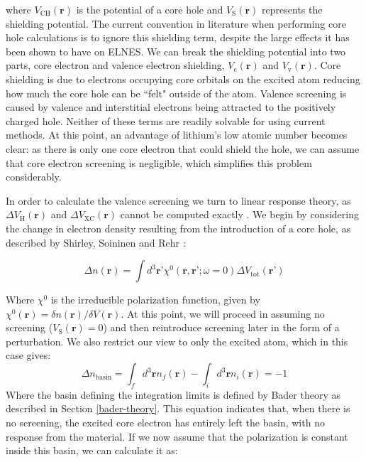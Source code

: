 where $V_{\mathrm{CH}}(\textbf{r})$ is the potential of a core hole and  $V_{\mathrm{S}}(\textbf{r})$ represents the shielding potential.  The current convention in literature when performing core hole calculations is to ignore this shielding term, despite the large effects it has been shown to have on ELNES.  We can break the shielding potential into two parts, core electron and valence electron shielding, $V_{\mathrm{c}}(\textbf{r})$ and  $V_{\mathrm{v}}(\textbf{r})$. Core shielding is due to electrons occupying core orbitals on the excited atom reducing how much the core hole can be ``felt" outside of the atom.  Valence screening is caused by valence and interstitial electrons being attracted to the positively charged hole.  Neither of these terms are readily solvable for using current methods.  At this point, an advantage of lithium's low atomic number becomes clear: as there is only one core electron that could shield the hole, we can assume that core electron screening is negligible, which simplifies this problem considerably.  

In order to calculate the valence screening we turn to linear response theory, as  $\Delta V_{\mathrm{H}}(\textbf{r})$ and $\Delta V_{\mathrm{XC}}(\textbf{r})$ cannot be computed exactly  \cite{shirley_modeling_2005}.  We begin by considering the change in electron density resulting from the introduction of a core hole, as described by Shirley, Soininen and Rehr \cite{shirley_modeling_2005}:

\begin{equation}
\Delta n(\textbf{r}) = \int d^3 \textbf{r'} \chi^0(\textbf{r},\textbf{r'}; \omega = 0)\Delta V_{\mathrm{tot}}(\textbf{r'})
\end{equation}

Where $\chi^0$ is the irreducible polarization function, given by $\chi^0(\textbf{r}) = \delta n(\textbf{r}) /  \delta V(\textbf{r})$.  At this point, we will proceed in assuming no screening ($V_{\mathrm{S}}(\textbf{r})=0$) and then reintroduce screening later in the form of a perturbation.  We also restrict our view to only the excited atom, which in this case gives:
\begin{equation}
\Delta n _{\mathrm{basin}} = \int_{f}d^3\textbf{r} n_{f}(\textbf{r}) - \int_{i}d^3\textbf{r} n_i(\textbf{r})= -1
\label{density_calc}
\end{equation}
Where the basin defining the integration limits is defined by Bader theory as described in Section \ref{bader-theory}. This equation indicates that, when there is no screening,  the excited core electron has entirely left the basin, with no response from the material. If we now assume that the polarization is constant inside this basin, we can calculate it as: 

